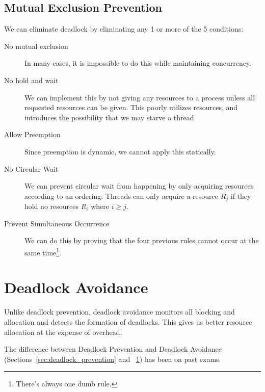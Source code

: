             \subsection{Mutual Exclusion Prevention} %
            \label{sub:mutual_exclusion_prevention}
                We can eliminate deadlock by eliminating any 1 or more of the 5 conditions:
                \begin{description}
                    \item[No mutual exclusion] In many cases, it is impossible to do this while maintaining concurrency.
                    \item[No hold and wait] We can implement this by not giving any resources to a process unless all requested resources can be given.
                    This poorly utilizes resources, and introduces the possibility that we may starve a thread.
                    \item[Allow Preemption] Since preemption is dynamic, we cannot apply this statically.
                    \item[No Circular Wait] We can prevent circular wait from happening by only acquiring resources according to an ordering.
                    Threads can only acquire a resource $R_j$ if they hold no resources $R_i$ where $i \ge j$.
                    \item[Prevent Simultaneous Occurrence] We can do this by proving that the four previous rules cannot occur at the same time\footnote{There's always one dumb rule.}.
                \end{description}
        \section{Deadlock Avoidance} %
        \label{sec:deadlock_avoidance}
            Unlike deadlock prevention, deadlock avoidance monitors all blocking and allocation and detects the formation of deadlocks.
            This gives us better resource allocation at the expense of overhead.
            \begin{minipage}[t]{1\columnwidth}
                \begin{shaded}
                    The difference between Deadlock Prevention and Deadlock Avoidance (Sections~\ref{sec:deadlock_prevention} and ~\ref{sec:deadlock_avoidance}) has been on past exams.
                \end{shaded}
            \end{minipage}
